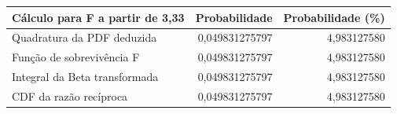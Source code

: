 \begin{tabular}{lrr}
\toprule
Cálculo para F a partir de 3,33 & Probabilidade & Probabilidade (\%) \\
\midrule
Quadratura da PDF deduzida & 0,049831275797 & 4,983127580 \\
Função de sobrevivência F & 0,049831275797 & 4,983127580 \\
Integral da Beta transformada & 0,049831275797 & 4,983127580 \\
CDF da razão recíproca & 0,049831275797 & 4,983127580 \\
\bottomrule
\end{tabular}
